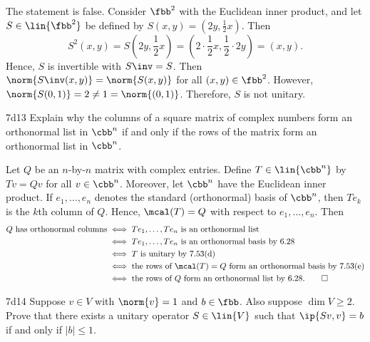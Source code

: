 \begin{sol}
    The statement is false.
    Consider $\fbb^2$ with the Euclidean inner product, and let $S \in \lin{\fbb^2}$ be defined by $S(x, y) = (2y, \frac{1}{2}x)$.
    Then
    \[
        S^2(x, y) = S\left(2y, \frac{1}{2}x\right) = \left(2 \cdot \frac{1}{2} x, \frac{1}{2} \cdot 2 y\right) = (x, y).
    \]
    Hence, $S$ is invertible with $S\inv = S$.
    Then $\norm{S\inv(x, y)} = \norm{S(x, y)}$ for all $(x, y) \in \fbb^2$.
    However, $\norm{S(0, 1)} = 2 \neq 1 = \norm{(0, 1)}$.
    Therefore, $S$ is not unitary.
\end{sol}

\begin{exercise}{7d13}
    Explain why the columns of a square matrix of complex numbers form an orthonormal list in $\cbb^n$ if and only if the rows of the matrix form an orthonormal list in $\cbb^n$.
\end{exercise}

\begin{sol}
    Let $Q$ be an $n$-by-$n$ matrix with complex entries.
    Define $T \in \lin{\cbb^n}$ by $T v = Qv$ for all $v \in \cbb^n$.
    Moreover, let $\cbb^n$ have the Euclidean inner product.
    If $e_1, \ldots, e_n$ denotes the standard (orthonormal) basis of $\cbb^n$, then $T e_k$ is the $k$th column of $Q$.
    Hence, $\mcal(T) = Q$ with respect to $e_1, \ldots, e_n$.
    Then
    \begin{align*}
        Q \text{ has orthonormal columns} &\iff T e_1, \ldots, T e_n \text{ is an orthonormal list} \\
        &\iff T e_1, \ldots, T e_n \text{ is an orthonormal basis by 6.28} \\
        &\iff T \text{ is unitary by 7.53(d)} \\
        &\iff \text{the rows of $\mcal(T) = Q$ form an orthonormal basis by 7.53(e)} \\
        &\iff \text{the rows of $Q$ form an orthonormal list by 6.28}. \qedhere
    \end{align*}
\end{sol}

\begin{exercise}{7d14}
    Suppose $v \in V$ with $\norm{v} = 1$ and $b \in \fbb$.
    Also suppose $\dim V \geq 2$.
    Prove that there exists a unitary operator $S \in \lin{V}$ such that $\ip{Sv, v} = b$ if and only if $|b| \leq 1$.
\end{exercise}

